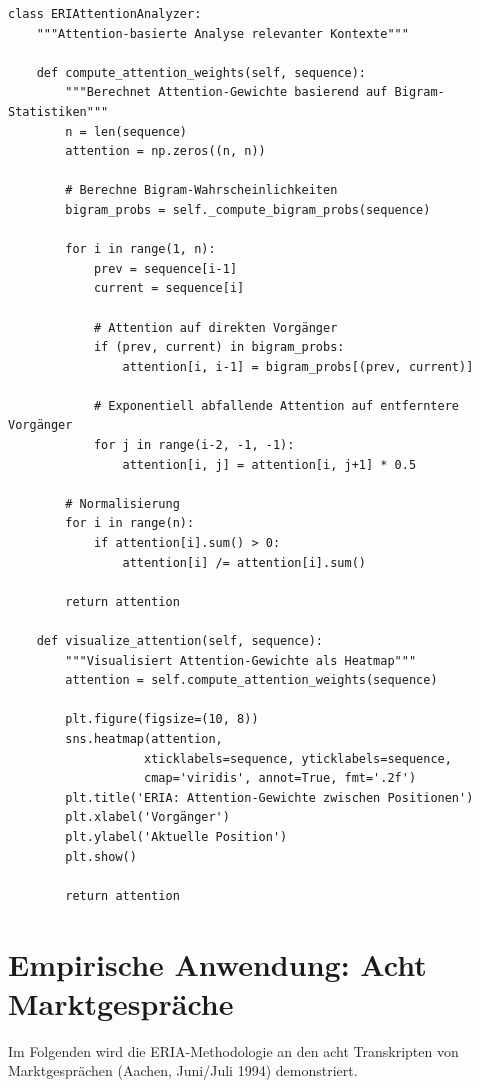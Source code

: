 \documentclass[12pt,a4paper]{article}
\begin{document}
\begin{lstlisting}[caption=Attention-Analyse in ERIA]
class ERIAttentionAnalyzer:
    """Attention-basierte Analyse relevanter Kontexte"""
    
    def compute_attention_weights(self, sequence):
        """Berechnet Attention-Gewichte basierend auf Bigram-Statistiken"""
        n = len(sequence)
        attention = np.zeros((n, n))
        
        # Berechne Bigram-Wahrscheinlichkeiten
        bigram_probs = self._compute_bigram_probs(sequence)
        
        for i in range(1, n):
            prev = sequence[i-1]
            current = sequence[i]
            
            # Attention auf direkten Vorgänger
            if (prev, current) in bigram_probs:
                attention[i, i-1] = bigram_probs[(prev, current)]
            
            # Exponentiell abfallende Attention auf entferntere Vorgänger
            for j in range(i-2, -1, -1):
                attention[i, j] = attention[i, j+1] * 0.5
        
        # Normalisierung
        for i in range(n):
            if attention[i].sum() > 0:
                attention[i] /= attention[i].sum()
        
        return attention
    
    def visualize_attention(self, sequence):
        """Visualisiert Attention-Gewichte als Heatmap"""
        attention = self.compute_attention_weights(sequence)
        
        plt.figure(figsize=(10, 8))
        sns.heatmap(attention, 
                   xticklabels=sequence, yticklabels=sequence,
                   cmap='viridis', annot=True, fmt='.2f')
        plt.title('ERIA: Attention-Gewichte zwischen Positionen')
        plt.xlabel('Vorgänger')
        plt.ylabel('Aktuelle Position')
        plt.show()
        
        return attention
\end{lstlisting}

\section{Empirische Anwendung: Acht Marktgespräche}

Im Folgenden wird die ERIA-Methodologie an den acht Transkripten von 
Marktgesprächen (Aachen, Juni/Juli 1994) demonstriert.
\end{document}
